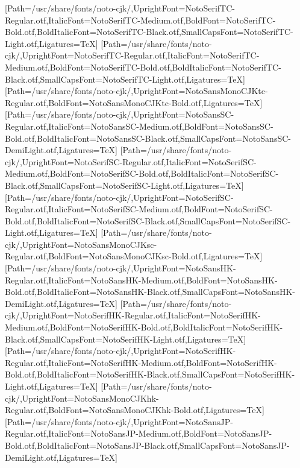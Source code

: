 \newfontfamily{}[Path=/usr/share/fonts/noto-cjk/,UprightFont=NotoSerifTC-Regular.otf,ItalicFont=NotoSerifTC-Medium.otf,BoldFont=NotoSerifTC-Bold.otf,BoldItalicFont=NotoSerifTC-Black.otf,SmallCapsFont=NotoSerifTC-Light.otf,Ligatures=TeX]
\newfontfamily{}[Path=/usr/share/fonts/noto-cjk/,UprightFont=NotoSerifTC-Regular.otf,ItalicFont=NotoSerifTC-Medium.otf,BoldFont=NotoSerifTC-Bold.otf,BoldItalicFont=NotoSerifTC-Black.otf,SmallCapsFont=NotoSerifTC-Light.otf,Ligatures=TeX]
\newfontfamily{}[Path=/usr/share/fonts/noto-cjk/,UprightFont=NotoSansMonoCJKtc-Regular.otf,BoldFont=NotoSansMonoCJKtc-Bold.otf,Ligatures=TeX]
\newfontfamily{}[Path=/usr/share/fonts/noto-cjk/,UprightFont=NotoSansSC-Regular.otf,ItalicFont=NotoSansSC-Medium.otf,BoldFont=NotoSansSC-Bold.otf,BoldItalicFont=NotoSansSC-Black.otf,SmallCapsFont=NotoSansSC-DemiLight.otf,Ligatures=TeX]
\newfontfamily{}[Path=/usr/share/fonts/noto-cjk/,UprightFont=NotoSerifSC-Regular.otf,ItalicFont=NotoSerifSC-Medium.otf,BoldFont=NotoSerifSC-Bold.otf,BoldItalicFont=NotoSerifSC-Black.otf,SmallCapsFont=NotoSerifSC-Light.otf,Ligatures=TeX]
\newfontfamily{}[Path=/usr/share/fonts/noto-cjk/,UprightFont=NotoSerifSC-Regular.otf,ItalicFont=NotoSerifSC-Medium.otf,BoldFont=NotoSerifSC-Bold.otf,BoldItalicFont=NotoSerifSC-Black.otf,SmallCapsFont=NotoSerifSC-Light.otf,Ligatures=TeX]
\newfontfamily{}[Path=/usr/share/fonts/noto-cjk/,UprightFont=NotoSansMonoCJKsc-Regular.otf,BoldFont=NotoSansMonoCJKsc-Bold.otf,Ligatures=TeX]
\newfontfamily{}[Path=/usr/share/fonts/noto-cjk/,UprightFont=NotoSansHK-Regular.otf,ItalicFont=NotoSansHK-Medium.otf,BoldFont=NotoSansHK-Bold.otf,BoldItalicFont=NotoSansHK-Black.otf,SmallCapsFont=NotoSansHK-DemiLight.otf,Ligatures=TeX]
\newfontfamily{}[Path=/usr/share/fonts/noto-cjk/,UprightFont=NotoSerifHK-Regular.otf,ItalicFont=NotoSerifHK-Medium.otf,BoldFont=NotoSerifHK-Bold.otf,BoldItalicFont=NotoSerifHK-Black.otf,SmallCapsFont=NotoSerifHK-Light.otf,Ligatures=TeX]
\newfontfamily{}[Path=/usr/share/fonts/noto-cjk/,UprightFont=NotoSerifHK-Regular.otf,ItalicFont=NotoSerifHK-Medium.otf,BoldFont=NotoSerifHK-Bold.otf,BoldItalicFont=NotoSerifHK-Black.otf,SmallCapsFont=NotoSerifHK-Light.otf,Ligatures=TeX]
\newfontfamily{}[Path=/usr/share/fonts/noto-cjk/,UprightFont=NotoSansMonoCJKhk-Regular.otf,BoldFont=NotoSansMonoCJKhk-Bold.otf,Ligatures=TeX]
\newfontfamily{}[Path=/usr/share/fonts/noto-cjk/,UprightFont=NotoSansJP-Regular.otf,ItalicFont=NotoSansJP-Medium.otf,BoldFont=NotoSansJP-Bold.otf,BoldItalicFont=NotoSansJP-Black.otf,SmallCapsFont=NotoSansJP-DemiLight.otf,Ligatures=TeX]
